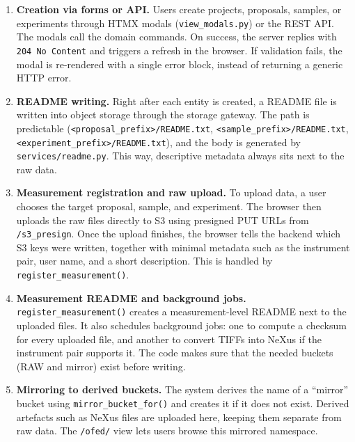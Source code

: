 \begin{enumerate}
	\item \textbf{Creation via forms or API.} Users create projects, proposals, samples, or experiments through HTMX modals 
	(\texttt{view\_modals.py}) or the REST API. The modals call the domain commands. 
	On success, the server replies with \texttt{204 No Content} and triggers a refresh in the browser. 
	If validation fails, the modal is re-rendered with a single error block, instead of returning a generic HTTP error.
	
	\item \textbf{README writing.} Right after each entity is created, a README file is written into object storage through the storage gateway. 
	The path is predictable (\texttt{<proposal\_prefix>/README.txt}, \texttt{<sample\_prefix>/README.txt}, 
	\texttt{<experiment\_prefix>/README.txt}), and the body is generated by \texttt{services/readme.py}. 
	This way, descriptive metadata always sits next to the raw data.
	
	\item \textbf{Measurement registration and raw upload.} 
	To upload data, a user chooses the target proposal, sample, and experiment. 
	The browser then uploads the raw files directly to S3 using presigned PUT URLs from \texttt{/s3\_presign}. 
	Once the upload finishes, the browser tells the backend which S3 keys were written, together with minimal metadata 
	such as the instrument pair, user name, and a short description. This is handled by \texttt{register\_measurement()}.
	
	\item \textbf{Measurement README and background jobs.} 
	\texttt{register\_measurement()} creates a measurement-level README next to the uploaded files. 
	It also schedules background jobs: one to compute a checksum for every uploaded file, and another to convert TIFFs into NeXus 
	if the instrument pair supports it. The code makes sure that the needed buckets (RAW and mirror) exist before writing.
	
	\item \textbf{Mirroring to derived buckets.} 
	The system derives the name of a “mirror” bucket using \texttt{mirror\_bucket\_for()} 
	and creates it if it does not exist. Derived artefacts such as NeXus files are uploaded here, 
	keeping them separate from raw data. The \texttt{/ofed/} view lets users browse this mirrored namespace.
\end{enumerate}
	
